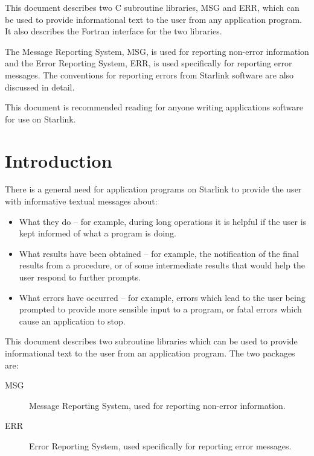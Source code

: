 \documentclass[twoside,11pt]{article}
\newcommand{\stardocinitials}  {SUN}
\newcommand{\stardocnumber}    {104.12}
\newcommand{\stardocabstract}  {
This document describes two C subroutine libraries, MSG and ERR, which
can be used to provide informational text to the user from any application
program.
It also describes the Fortran interface for the two libraries.
\par
The Message Reporting System, MSG, is used for reporting non-error information
and the Error Reporting System, ERR, is used specifically for reporting error
messages.
The conventions for reporting errors from Starlink software are also
discussed in detail.
\par
This document is recommended reading for anyone writing applications
software for use on Starlink.
}
\newcommand{\stardocname}{\stardocinitials /\stardocnumber}
\newenvironment{latexonly}{}{}
\newcommand{\xlabel}[1]{}
\renewcommand{\_}{\texttt{\symbol{95}}}
\renewcommand{\thepage}{\roman{page}}
\begin{document}
\stardocabstract
  \newpage
  \begin{latexonly}
    \setlength{\parskip}{0mm}
    \tableofcontents
    \setlength{\parskip}{\medskipamount}
    \markboth{\stardocname}{\stardocname}
  \end{latexonly}
\cleardoublepage
\renewcommand{\thepage}{\arabic{page}}
\setcounter{page}{1}


\section{\xlabel{introduction}Introduction}

There is a general need for application programs on Starlink to provide the
user with informative textual messages about:

\begin {itemize}
\item What they do -- for example, during long operations it is helpful if the
user is kept informed of what a program is doing.

\item What results have been obtained -- for example, the notification of  the
final results from a procedure, or of some intermediate results that would help
the user respond to further prompts.

\item What errors have occurred -- for example, errors which lead to the user
being prompted to provide more sensible input to a program, or fatal
errors which cause an application to stop.
\end {itemize}

This document describes two subroutine libraries which can be used to provide
informational text to the user from an application program.
The two packages are:

\begin {description}
\item [MSG] Message Reporting System, used for reporting non-error information.
\item [ERR] Error Reporting System, used specifically for reporting error
messages.
\end {description}
\end{document}
